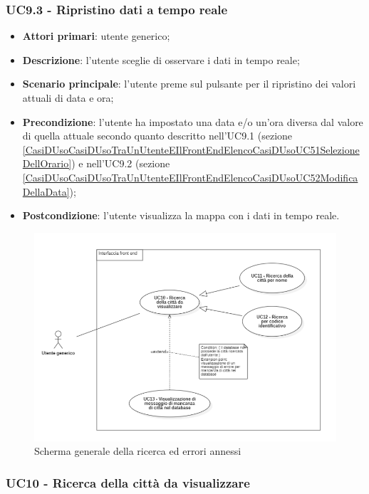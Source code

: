 \subsubsection{UC9.3 - Ripristino dati a tempo reale}\label{CasiDUsoCasiDUsoTraUnUtenteEIlFrontEndElencoCasiDUsoUC53RipristinoDatiATempoReale}
\begin{itemize}
	\item \textbf{Attori primari}: utente generico;
	\item \textbf{Descrizione}:  l’utente sceglie di osservare i dati in tempo reale;
	\item \textbf{Scenario principale}: l’utente preme sul pulsante per il ripristino dei valori attuali di data e ora;
	\item \textbf{Precondizione}: l’utente ha impostato una data e/o un’ora diversa dal valore di quella attuale secondo quanto descritto nell'UC9.1 (sezione \ref{CasiDUsoCasiDUsoTraUnUtenteEIlFrontEndElencoCasiDUsoUC51SelezioneDellOrario}) e nell'UC9.2 (sezione \ref{CasiDUsoCasiDUsoTraUnUtenteEIlFrontEndElencoCasiDUsoUC52ModificaDellaData});
	\item \textbf{Postcondizione}: l’utente visualizza la mappa con i dati in tempo reale.
\end{itemize}


\begin{center}
	\begin{figure}[H]
		\centering\includegraphics[scale=0.6]{../immagini/attori_casi/UC_10.png}
		\caption{Scherma generale della ricerca ed errori annessi}
	\end{figure}
\end{center}


\subsubsection{UC10 - Ricerca della città da visualizzare}\label{CasiDUsoCasiDUsoTraUnUtenteEIlFrontEndElencoCasiDUsoUC6RicercaDellaCittàDaVisualizzare}

